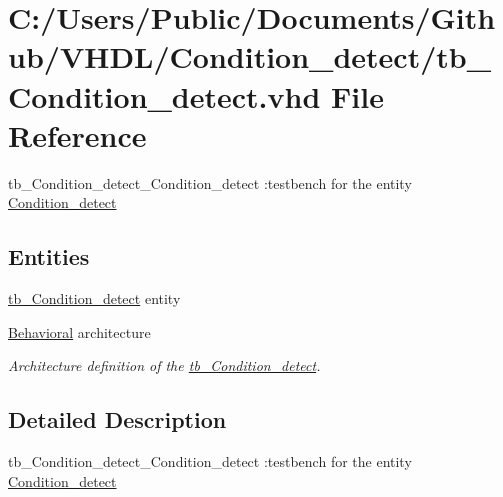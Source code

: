 \hypertarget{tb___condition__detect_8vhd}{}\section{C\+:/\+Users/\+Public/\+Documents/\+Github/\+V\+H\+D\+L/\+Condition\+\_\+detect/tb\+\_\+\+Condition\+\_\+detect.vhd File Reference}
\label{tb___condition__detect_8vhd}


tb\+\_\+\+Condition\+\_\+detect\+\_\+\+Condition\+\_\+detect \+:testbench for the entity \hyperlink{class_condition__detect}{Condition\+\_\+detect}  


\subsection*{Entities}
\begin{DoxyCompactItemize}
\item 
\hyperlink{classtb___condition__detect}{tb\+\_\+\+Condition\+\_\+detect} entity
\item 
\hyperlink{classtb___condition__detect_1_1_behavioral}{Behavioral} architecture
\begin{DoxyCompactList}\small\item\em Architecture definition of the \hyperlink{classtb___condition__detect}{tb\+\_\+\+Condition\+\_\+detect}. \end{DoxyCompactList}\end{DoxyCompactItemize}


\subsection{Detailed Description}
tb\+\_\+\+Condition\+\_\+detect\+\_\+\+Condition\+\_\+detect \+:testbench for the entity \hyperlink{class_condition__detect}{Condition\+\_\+detect} 

